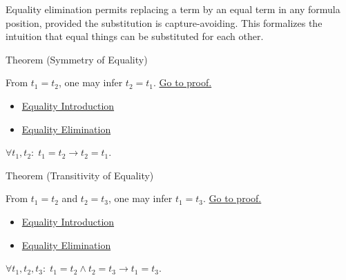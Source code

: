 \begin{remark*}
Equality elimination permits replacing a term by an equal term in any formula
position, provided the substitution is capture-avoiding. This formalizes the
intuition that equal things can be substituted for each other.
\end{remark*}


\begin{theorembox}{Theorem (Symmetry of Equality)}
\begin{theorem}\label{thm:eq-sym}
From $t_1 = t_2$, one may infer $t_2 = t_1$.
\hyperref[prf:eq-sym]{Go to proof.}
\end{theorem}
\end{theorembox}

\begin{dependencies}
\begin{itemize}
  \item \hyperref[def:eq-refl]{Equality Introduction}
  \item \hyperref[def:eq-elim]{Equality Elimination}
\end{itemize}
\end{dependencies}

\begin{remark*}
$\forall t_1, t_2:\; t_1=t_2 \to t_2=t_1$.
\end{remark*}


\begin{theorembox}{Theorem (Transitivity of Equality)}
\begin{theorem}\label{thm:eq-trans}
From $t_1 = t_2$ and $t_2 = t_3$, one may infer $t_1 = t_3$.
\hyperref[prf:eq-trans]{Go to proof.}
\end{theorem}
\end{theorembox}

\begin{dependencies}
\begin{itemize}
  \item \hyperref[def:eq-refl]{Equality Introduction}
  \item \hyperref[def:eq-elim]{Equality Elimination}
\end{itemize}
\end{dependencies}

\begin{remark*}
$\forall t_1, t_2, t_3:\; t_1=t_2 \wedge t_2=t_3 \to t_1=t_3$.
\end{remark*}


